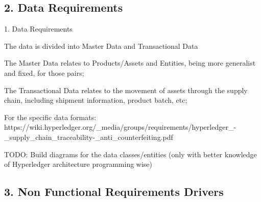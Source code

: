 \subsection*{2. Data Requirements}
	1. Data Requirements
		\par The data is divided into Master Data and Transactional Data
		\par The Master Data relates to Products/Assets and Entities, being more generalist and fixed, for those pairs;
		\par The Transactional Data relates to the movement of assets through the supply chain, including shipment information, product batch, etc;
		\par For the specific data formats: https://wiki.hyperledger.org/\_media/groups/requirements/hyperledger\_-\_supply\_chain\_traceability-\_anti\_counterfeiting.pdf
		\par TODO: Build diagrams for the data classes/entities (only with better knowledge of Hyperledger architecture programming wise)
		
		

\subsection*{3. Non Functional Requirements Drivers}

